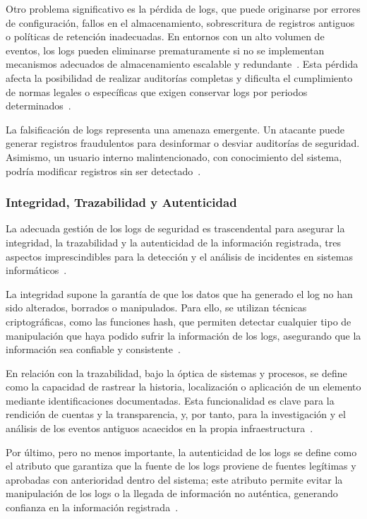 Otro problema significativo es la pérdida de logs, que puede originarse por errores de configuración, fallos en el almacenamiento, sobrescritura de registros antiguos o políticas de retención inadecuadas. En entornos con un alto volumen de eventos, los logs pueden eliminarse prematuramente si no se implementan mecanismos adecuados de almacenamiento escalable y redundante~\cite{lonvick2001syslog}. Esta pérdida afecta la posibilidad de realizar auditorías completas y dificulta el cumplimiento de normas legales o específicas que exigen conservar logs por periodos determinados~\cite{iso27001}.

La falsificación de logs representa una amenaza emergente. Un atacante puede generar registros fraudulentos para desinformar o desviar auditorías de seguridad. Asimismo, un usuario interno malintencionado, con conocimiento del sistema, podría modificar registros sin ser detectado~\cite{MorilloReina2025Decentralized}. 


\subsubsection{Integridad, Trazabilidad y Autenticidad}
La adecuada gestión de los logs de seguridad es trascendental para asegurar la integridad, la trazabilidad y la autenticidad de la información registrada, tres aspectos imprescindibles para la detección y el análisis de incidentes en sistemas informáticos~\cite{Boutaba2019}. 

La integridad supone la garantía de que los datos que ha generado el log no han sido alterados, borrados o manipulados. Para ello, se utilizan técnicas criptográficas, como las funciones hash, que permiten detectar cualquier tipo de manipulación que haya podido sufrir la información de los logs, asegurando que la información sea confiable y consistente~\cite{Perrig2000}. 

En relación con la trazabilidad, bajo la óptica de sistemas y procesos, se define como la capacidad de rastrear la historia, localización o aplicación de un elemento mediante identificaciones documentadas. Esta funcionalidad es clave para la rendición de cuentas y la transparencia, y, por tanto, para la investigación y el análisis de los eventos antiguos acaecidos en la propia infraestructura~\cite{ISO9000-2015}.

Por último, pero no menos importante, la autenticidad de los logs se define como el atributo que garantiza que la fuente de los logs proviene de fuentes legítimas y aprobadas con anterioridad dentro del sistema; este atributo permite evitar la manipulación de los logs o la llegada de información no auténtica, generando confianza en la información registrada~\cite{Schneier2000}.


